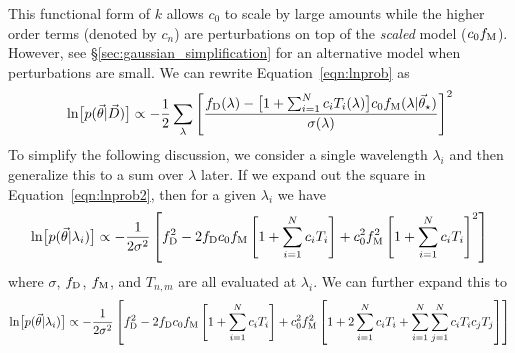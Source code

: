 \documentclass[preprint]{aastex} %
\newcommand{\vt}{\vec{\theta}}
\newcommand{\vstar}{\vt_{\star}}
\newcommand{\fM}{f_{\rm M}}
\newcommand{\fD}{f_{\rm D}}
\newcommand{\vD}{\vec{D}}
\begin{document}
This functional form of $k$ allows $c_0$ to scale by large amounts while the higher order terms (denoted by $c_n$) are perturbations on top of the \emph{scaled} model ($c_0 \fM$). However, see \S\ref{sec:gaussian_simplification} for an alternative model when perturbations are small. We can rewrite Equation~\ref{eqn:lnprob} as 
\begin{equation}
  \ln \bigl [p(\vt | \vD) \bigr] \propto - \frac{1}{2} \sum_\lambda \left [\frac{\fD(\lambda) - \bigl [1 + \sum^N_{i = 1} c_i T_i(\lambda) \bigr ] c_0 \fM(\lambda | \vstar)  }{\sigma(\lambda)} \right ]^2
  \label{eqn:lnprob2}
\end{equation}
To simplify the following discussion, we consider a single wavelength $\lambda_i$ and then generalize this to a sum over $\lambda$ later. If we expand out the square in Equation~\ref{eqn:lnprob2}, then for a given $\lambda_i$ we have
\begin{equation}
  \ln \bigl [p(\vt | \lambda_i) \bigr] \propto -\frac{1}{2 \sigma^2} \left [ \fD^2 - 2 \fD c_0 \fM \left [1+ \sum_{i=1}^N c_i T_i \right ]+ c_0^2 \fM^2 \left [1 + \sum_{i=1}^N c_i T_i \right ]^2 \right ]
 \label{eqn:lnprob_lambda}
 \end{equation}
where $\sigma$, $\fD$, $\fM$, and $T_{n,m}$ are all evaluated at $\lambda_i$. We can further expand this to
\begin{equation}
  \ln \bigl [p(\vt | \lambda_i) \bigr] \propto - \frac{1}{2 \sigma^2} \left [ \fD^2 - 2 \fD c_0 \fM \left [1+ \sum_{i=1}^N c_i T_i \right ]+ c_0^2 \fM^2 \left [1 + 2 \sum_{i=1}^N c_i T_i + \sum_{i=1}^N \sum_{j=1}^N c_i T_i c_j T_j \right ] \right ]
  \label{eqn:expanded}
 \end{equation}
\end{document}
